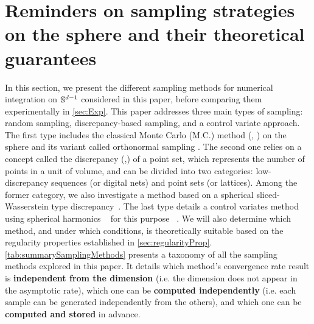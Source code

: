 \section{Reminders on sampling strategies on the sphere and their theoretical guarantees}\label{sec:Sampling}
{In this section, we present the different 
sampling methods for numerical integration on $\mathbb{S}^{d-1}$ considered in this paper, 
before comparing them experimentally in \autoref{sec:Exp}. This paper addresses 
three main types of sampling: random sampling, discrepancy-based sampling, and a 
control variate approach. The first type includes the classical Monte Carlo 
(M.C.) method (\citep{hammersley1964monte}, \citep{lemieux2009monte}) on the 
sphere and its variant called orthonormal sampling 
\citep{rowland2019orthogonal}. The second one relies on a concept called the 
discrepancy (\citep{lemieux2009monte},\citep{dick2010digital}) of a point set, 
which represents the number of points in a unit of volume, and can be divided 
into two categories: low-discrepancy sequences (or digital nets) and point sets 
(or lattices). {Among the former category, we also investigate a method based on a spherical sliced-Wasserstein type discrepancy~\citep{bonet2023sphericalslicedwasserstein}.} The last type details a control variates method 
~\citep{lemieux2009monte} using spherical harmonics ~\citep{Muller1998} for this 
purpose ~\citep{leluc2024slicedwassersteinestimationsphericalharmonics}. We will 
also determine which method, and under which conditions, is theoretically 
suitable based on the regularity properties established in 
\autoref{sec:regularityProp}. \autoref{tab:summarySamplingMethods} presents a 
taxonomy of all the sampling methods explored in this paper. It details which 
method's convergence rate result is \textbf{independent from the dimension} 
({i.e.} the dimension does not appear in the asymptotic rate), which one 
can be \textbf{computed independently} 
({i.e.} each sample can be generated 
independently from the others), and which one can be \textbf{computed and 
stored} in advance.} 

